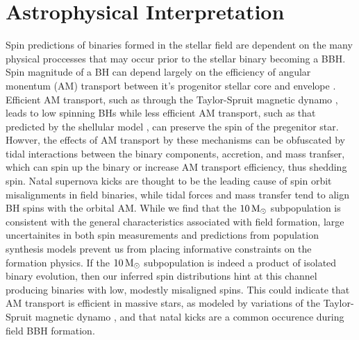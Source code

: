 \section{Astrophysical Interpretation} \label{sec:astro}


Spin predictions of binaries formed in the stellar field are dependent on the many physical proccesses that may occur prior to the stellar binary becoming a BBH.  Spin magnitude of a BH can depend largely on the efficiency of angular monentum (AM) transport between it's progenitor stellar core and envelope \citep{2203.02515}. Efficient AM transport, such as through the Taylor-Spruit magnetic dynamo \citep{10.1051/0004-6361:20011465}, leads to low spinning BHs \citep{10.3847/2041-8213/ab339b} while less efficient AM transport, such as that predicted by the shellular model \citep{1992A&A...265..115Z,2012A&A...537A.146E,10.3847/1538-4365/aacb24,2019MNRAS.485.4641C}, can preserve the spin of the pregenitor star. Howver, the effects of AM transport by these mechanisms can be obfuscated by tidal interactions between the binary components, accretion, and mass tranfser, which can spin up the binary or increase AM transport efficiency, thus shedding spin. Natal supernova kicks are thought to be the leading cause of spin orbit misalignments in field binaries, while tidal forces and mass transfer tend to align BH spins with the orbital AM.  While we find that the $10{\,\rm M}_\odot$ subpopulation is consistent with the general characteristics associated with field formation, large uncertainites in both spin measurements and predictions from population synthesis models prevent us from placing informative constraints on the formation physics. If the $10{\,\rm M}_\odot$ subpopulation is indeed a product of isolated binary evolution, then our inferred spin distributions hint at this channel producing binaries with low, modestly misaligned spins. This could indicate that AM transport is efficient in massive stars, as modeled by variations of the Taylor-Spruit magnetic dynamo \citep{1706.07053}, and that natal kicks are a common occurence during field BBH formation. 

